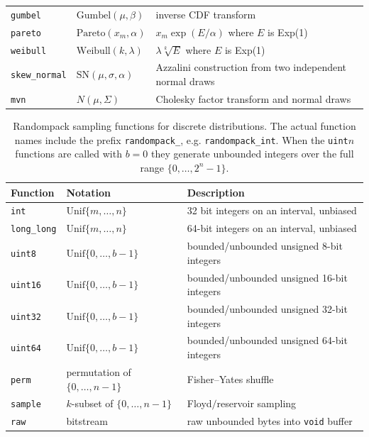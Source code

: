 \documentclass[manuscript,screen,review]{acmart}
\begin{document}
\begin{table}[t]
\begin{tabular}{lll}
  \texttt{gumbel}      & $\mathrm{Gumbel}(\mu,\beta)$         & inverse CDF transform                                                        \\
  \texttt{pareto}      & $\mathrm{Pareto}(x_m,\alpha)$        & $x_m\exp(E/\alpha)$ where $E$ is Exp(1)                                      \\
  \texttt{weibull}     & $\mathrm{Weibull}(k,\lambda)$        & $\lambda \sqrt[k]{E}$ where $E$ is Exp(1)                                    \\
  \texttt{skew\_normal}& $\mathrm{SN}(\mu,\sigma,\alpha)$     & Azzalini construction from two independent normal draws                      \\
  \texttt{mvn}         & $N(\mu,\Sigma)$                      & Cholesky factor transform and normal draws                                   \\
  \bottomrule
\end{tabular}
\end{table}

\begin{table}[t]
\centering
\caption{Randompack sampling functions for discrete distributions. The actual function names include the prefix
  \texttt{randompack\_}, e.g. \texttt{randompack\_int}. When the \texttt{uint$n$} functions are called with
  $b = 0$ they generate unbounded integers over the full range $\{0,\ldots,2^n-1\}$.}
\label{tab:discrete}
\begin{tabular}{lll}
  \toprule
  Function            & Notation                          & Description                                \\
  \midrule
  \texttt{int}        & $\mathrm{Unif}\{m,\ldots,n\}$     & 32 bit integers on an interval, unbiased   \\
  \texttt{long\_long} & $\mathrm{Unif}\{m,\ldots,n\}$     & 64-bit integers on an interval, unbiased   \\
  \texttt{uint8}      & $\mathrm{Unif}\{0,\ldots,b-1\}$   & bounded/unbounded unsigned 8-bit integers  \\
  \texttt{uint16}     & $\mathrm{Unif}\{0,\ldots,b-1\}$   & bounded/unbounded unsigned 16-bit integers \\
  \texttt{uint32}     & $\mathrm{Unif}\{0,\ldots,b-1\}$   & bounded/unbounded unsigned 32-bit integers \\
  \texttt{uint64}     & $\mathrm{Unif}\{0,\ldots,b-1\}$   & bounded/unbounded unsigned 64-bit integers \\
  \texttt{perm}       & permutation of $\{0,\ldots,n-1\}$ & Fisher--Yates shuffle                      \\
  \texttt{sample}     & $k$-subset of $\{0,\ldots,n-1\}$  & Floyd$/$reservoir sampling                 \\
  \texttt{raw}        & bitstream                         & raw unbounded bytes into \texttt{void} buffer \\
  \bottomrule
\end{tabular}
\end{table}
\end{document}
